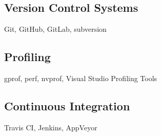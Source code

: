 
\subsection{Version Control Systems}
Git, GitHub, GitLab, subversion

\subsection{Profiling}
gprof, perf, nvprof, Visual Studio Profiling Tools

\subsection{Continuous Integration}
Travis CI, Jenkins, AppVeyor
